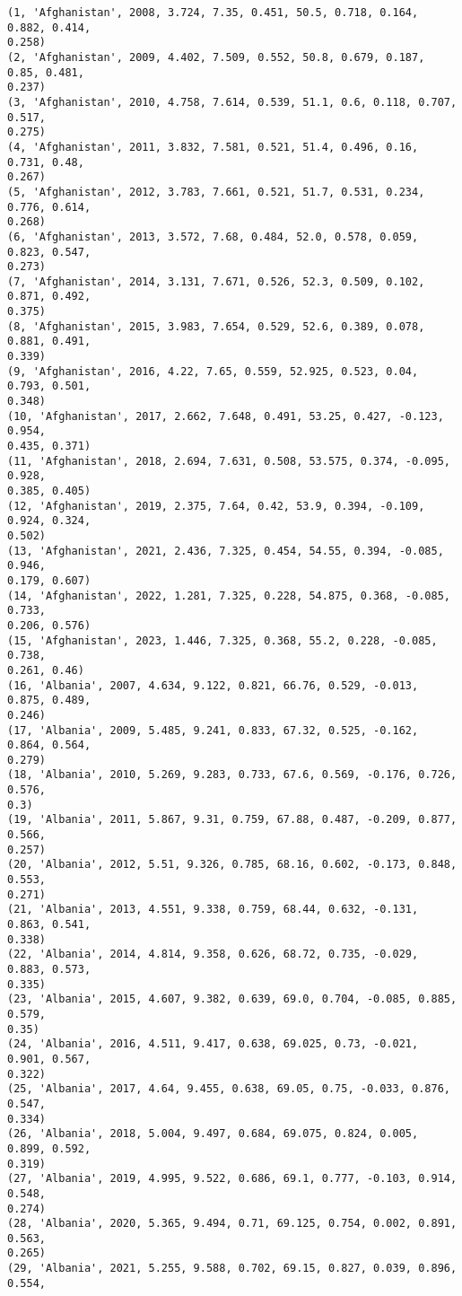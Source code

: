\documentclass[11pt]{article}
\begin{document}
    \begin{Verbatim}[commandchars=\\\{\}]
(1, 'Afghanistan', 2008, 3.724, 7.35, 0.451, 50.5, 0.718, 0.164, 0.882, 0.414,
0.258)
(2, 'Afghanistan', 2009, 4.402, 7.509, 0.552, 50.8, 0.679, 0.187, 0.85, 0.481,
0.237)
(3, 'Afghanistan', 2010, 4.758, 7.614, 0.539, 51.1, 0.6, 0.118, 0.707, 0.517,
0.275)
(4, 'Afghanistan', 2011, 3.832, 7.581, 0.521, 51.4, 0.496, 0.16, 0.731, 0.48,
0.267)
(5, 'Afghanistan', 2012, 3.783, 7.661, 0.521, 51.7, 0.531, 0.234, 0.776, 0.614,
0.268)
(6, 'Afghanistan', 2013, 3.572, 7.68, 0.484, 52.0, 0.578, 0.059, 0.823, 0.547,
0.273)
(7, 'Afghanistan', 2014, 3.131, 7.671, 0.526, 52.3, 0.509, 0.102, 0.871, 0.492,
0.375)
(8, 'Afghanistan', 2015, 3.983, 7.654, 0.529, 52.6, 0.389, 0.078, 0.881, 0.491,
0.339)
(9, 'Afghanistan', 2016, 4.22, 7.65, 0.559, 52.925, 0.523, 0.04, 0.793, 0.501,
0.348)
(10, 'Afghanistan', 2017, 2.662, 7.648, 0.491, 53.25, 0.427, -0.123, 0.954,
0.435, 0.371)
(11, 'Afghanistan', 2018, 2.694, 7.631, 0.508, 53.575, 0.374, -0.095, 0.928,
0.385, 0.405)
(12, 'Afghanistan', 2019, 2.375, 7.64, 0.42, 53.9, 0.394, -0.109, 0.924, 0.324,
0.502)
(13, 'Afghanistan', 2021, 2.436, 7.325, 0.454, 54.55, 0.394, -0.085, 0.946,
0.179, 0.607)
(14, 'Afghanistan', 2022, 1.281, 7.325, 0.228, 54.875, 0.368, -0.085, 0.733,
0.206, 0.576)
(15, 'Afghanistan', 2023, 1.446, 7.325, 0.368, 55.2, 0.228, -0.085, 0.738,
0.261, 0.46)
(16, 'Albania', 2007, 4.634, 9.122, 0.821, 66.76, 0.529, -0.013, 0.875, 0.489,
0.246)
(17, 'Albania', 2009, 5.485, 9.241, 0.833, 67.32, 0.525, -0.162, 0.864, 0.564,
0.279)
(18, 'Albania', 2010, 5.269, 9.283, 0.733, 67.6, 0.569, -0.176, 0.726, 0.576,
0.3)
(19, 'Albania', 2011, 5.867, 9.31, 0.759, 67.88, 0.487, -0.209, 0.877, 0.566,
0.257)
(20, 'Albania', 2012, 5.51, 9.326, 0.785, 68.16, 0.602, -0.173, 0.848, 0.553,
0.271)
(21, 'Albania', 2013, 4.551, 9.338, 0.759, 68.44, 0.632, -0.131, 0.863, 0.541,
0.338)
(22, 'Albania', 2014, 4.814, 9.358, 0.626, 68.72, 0.735, -0.029, 0.883, 0.573,
0.335)
(23, 'Albania', 2015, 4.607, 9.382, 0.639, 69.0, 0.704, -0.085, 0.885, 0.579,
0.35)
(24, 'Albania', 2016, 4.511, 9.417, 0.638, 69.025, 0.73, -0.021, 0.901, 0.567,
0.322)
(25, 'Albania', 2017, 4.64, 9.455, 0.638, 69.05, 0.75, -0.033, 0.876, 0.547,
0.334)
(26, 'Albania', 2018, 5.004, 9.497, 0.684, 69.075, 0.824, 0.005, 0.899, 0.592,
0.319)
(27, 'Albania', 2019, 4.995, 9.522, 0.686, 69.1, 0.777, -0.103, 0.914, 0.548,
0.274)
(28, 'Albania', 2020, 5.365, 9.494, 0.71, 69.125, 0.754, 0.002, 0.891, 0.563,
0.265)
(29, 'Albania', 2021, 5.255, 9.588, 0.702, 69.15, 0.827, 0.039, 0.896, 0.554,

\end{Verbatim}
\end{document}

